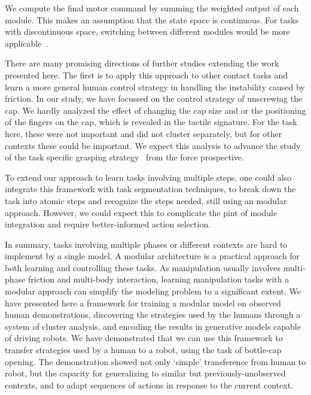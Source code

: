 We compute the final motor command by summing the weighted output of
each module. This makes an assumption that the state space is
continuous. For tasks with discontinuous space, switching between different modules would be more applicable~\citep{narendra1995adaptation,nakanishi2013spatio}.

There are many promising directions of further studies extending the
work presented here. The first is to apply this approach to other
contact tasks and learn a more general human control strategy in
handling the instability caused by friction.
In our study, we have focussed on the control strategy of unscrewing
the cap. We hardly analyzed the effect of changing the cap size and or
the positioning of the fingers on the cap, which is revealed in the
tactile signature. For the task here, these were not important and
did not cluster separately, but for other contexts these could be
important. We expect this analysis to advance the study of the task specific grasping
strategy~\citep{el2013generation,dang2014semantic} from the force prospective.

To extend our approach to learn tasks involving multiple steps, one
could also integrate this framework with task segmentation techniques,
to break down the task into atomic steps and recognize the steps
needed, still using an modular approach. However, we could expect this
to complicate the pint of module integration and require
better-informed action selection. 

In summary, tasks involving multiple phases or different contexts are
hard to implement by a single model. A modular architecture is a
practical approach for both learning and controlling these tasks. As
manipulation usually involves multi-phase friction and multi-body
interaction, learning manipulation tasks with a modular approach can
simplify the modeling problem to a significant extent. We have
presented here a framework for training a modular model on observed
human demonstrations, discovering the strategies used by the humans
through a system of cluster analysis, and encoding
the results in generative models capable of driving robots. We have
demonstrated that we can use this framework to transfer strategies
used by a human to a robot, using the task of bottle-cap
opening. The demonstration showed not only `simple' transference from
human to robot, but the capacity for generalizing to similar but
previously-unobserved contexts, and to adapt sequences of actions in
response to the current context.


